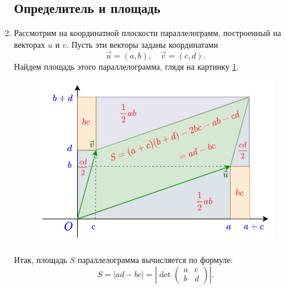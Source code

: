 \begin{enumerate}
\subsection*{Определитель и площадь}

\item Рассмотрим на координатной плоскости параллелограмм, построенный на векторах $u$ и $v$. Пусть эти векторы заданы координатами
$$
\vec u=(a,b),\quad \vec v=(c,d).
$$
Найдем площадь этого параллелограмма, глядя на картинку \ref{paralel}.

\begin{figure}[hbt!]
\begin{center}
\includegraphics[scale=0.4]{paralel.png}
\end{center}
\caption{}\label{paralel}
\end{figure}

Итак, площадь $S$ параллелограмма вычисляется по формуле:
$$
S=|ad-bc|=\left|\det\begin{pmatrix}a & c \\ b & d\end{pmatrix}\right|.
$$


\end{enumerate}
